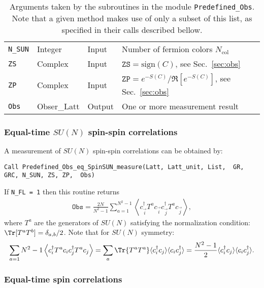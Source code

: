 \begin{table}[h]
\begin{center}
\begin{tabular}{@{} p{}  p{} p{} p{}  @{}}
			\texttt{N\_SUN}               & Integer    & Input  & Number of fermion colors $N_{\mathrm{col}}$\\
			\texttt{ZS}                   & Complex    & Input  & $\texttt{ZS} = \text{sign}(C)$, see Sec.~\ref{sec:obs}\\
			\texttt{ZP}                   & Complex    & Input  & $\texttt{ZP} = e^{-S(C)}/\Re \left[e^{-S(C)} \right]$, see Sec.~\ref{sec:obs}\\
			\texttt{Obs}                  & Obser\_Latt& Output & One or more measurement result\\
			\bottomrule
		\end{tabular}
		\caption{Arguments taken by the subroutines in the module \texttt{Predefined\_Obs}. Note that a given method makes use of only a subset of this list, as specified in their calls described bellow.}		\label{table:predefined_obs}
	\end{center}
\end{table}


\subsubsection{Equal-time $SU(N)$ spin-spin correlations}

A measurement of $SU(N)$ spin-spin correlations can be obtained by:

\begin{lstlisting}[style=fortran]
Call Predefined_Obs_eq_SpinSUN_measure(Latt, Latt_unit, List,  GR, GRC, N_SUN, ZS, ZP,  Obs)
\end{lstlisting}

If \texttt{N\_FL = 1} then  this routine returns
\begin{align}
\texttt{Obs} = \frac{2N}{N^2-1}\sum_{a=1}^{N^2 - 1}  \left\langle c^{\dagger}_{\vec{i}} T^a c_{\vec{i}}  c^{\dagger}_{\vec{j}} T^a  c_{\vec{j}}\right\rangle,
\end{align}
where $T^a$ are the generators of $SU(N)$ satisfying the normalization condition:  $\Tr [ T^a  T^b ]= \delta_{a,b}/2$. Note that for $SU(N)$ symmetry:
\begin{align}
\sum_{a=1}{N^2 - 1 }  \left\langle c^{\dagger}_i T^a c_i  c^{\dagger}_j T^a  c_j\right\rangle   = \sum_{a} \Tr{T^a T^a} \langle c^{\dagger}_i c_j\rangle \langle c_i c^{\dagger}_j\rangle = \frac{N^2 -1}{2} \langle c^{\dagger}_i c_j\rangle \langle c_i c^{\dagger}_j\rangle.
\end{align}


\subsubsection{Equal-time spin correlations}

